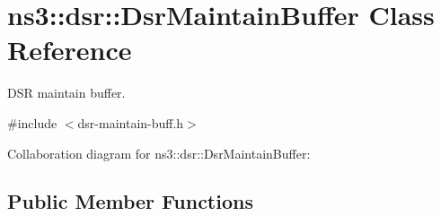 \hypertarget{classns3_1_1dsr_1_1DsrMaintainBuffer}{}\section{ns3\+:\+:dsr\+:\+:Dsr\+Maintain\+Buffer Class Reference}
\label{classns3_1_1dsr_1_1DsrMaintainBuffer}


D\+SR maintain buffer.  




{\ttfamily \#include $<$dsr-\/maintain-\/buff.\+h$>$}



Collaboration diagram for ns3\+:\+:dsr\+:\+:Dsr\+Maintain\+Buffer\+:
\subsection*{Public Member Functions}
